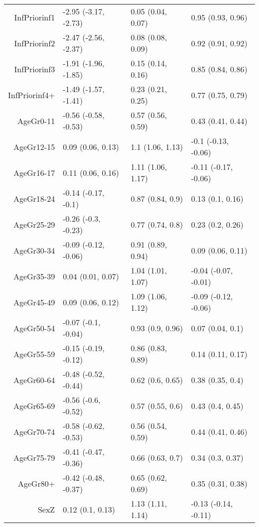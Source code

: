 \begin{table}[ht]
\begin{tabular}{rlll}
  InfPriorinf1 & -2.95 (-3.17, -2.73) & 0.05 (0.04, 0.07) & 0.95 (0.93, 0.96) \\ 
  InfPriorinf2 & -2.47 (-2.56, -2.37) & 0.08 (0.08, 0.09) & 0.92 (0.91, 0.92) \\ 
  InfPriorinf3 & -1.91 (-1.96, -1.85) & 0.15 (0.14, 0.16) & 0.85 (0.84, 0.86) \\ 
  InfPriorinf4+ & -1.49 (-1.57, -1.41) & 0.23 (0.21, 0.25) & 0.77 (0.75, 0.79) \\ 
  AgeGr0-11 & -0.56 (-0.58, -0.53) & 0.57 (0.56, 0.59) & 0.43 (0.41, 0.44) \\ 
  AgeGr12-15 & 0.09 (0.06, 0.13) & 1.1 (1.06, 1.13) & -0.1 (-0.13, -0.06) \\ 
  AgeGr16-17 & 0.11 (0.06, 0.16) & 1.11 (1.06, 1.17) & -0.11 (-0.17, -0.06) \\ 
  AgeGr18-24 & -0.14 (-0.17, -0.1) & 0.87 (0.84, 0.9) & 0.13 (0.1, 0.16) \\ 
  AgeGr25-29 & -0.26 (-0.3, -0.23) & 0.77 (0.74, 0.8) & 0.23 (0.2, 0.26) \\ 
  AgeGr30-34 & -0.09 (-0.12, -0.06) & 0.91 (0.89, 0.94) & 0.09 (0.06, 0.11) \\ 
  AgeGr35-39 & 0.04 (0.01, 0.07) & 1.04 (1.01, 1.07) & -0.04 (-0.07, -0.01) \\ 
  AgeGr45-49 & 0.09 (0.06, 0.12) & 1.09 (1.06, 1.12) & -0.09 (-0.12, -0.06) \\ 
  AgeGr50-54 & -0.07 (-0.1, -0.04) & 0.93 (0.9, 0.96) & 0.07 (0.04, 0.1) \\ 
  AgeGr55-59 & -0.15 (-0.19, -0.12) & 0.86 (0.83, 0.89) & 0.14 (0.11, 0.17) \\ 
  AgeGr60-64 & -0.48 (-0.52, -0.44) & 0.62 (0.6, 0.65) & 0.38 (0.35, 0.4) \\ 
  AgeGr65-69 & -0.56 (-0.6, -0.52) & 0.57 (0.55, 0.6) & 0.43 (0.4, 0.45) \\ 
  AgeGr70-74 & -0.58 (-0.62, -0.53) & 0.56 (0.54, 0.59) & 0.44 (0.41, 0.46) \\ 
  AgeGr75-79 & -0.41 (-0.47, -0.36) & 0.66 (0.63, 0.7) & 0.34 (0.3, 0.37) \\ 
  AgeGr80+ & -0.42 (-0.48, -0.37) & 0.65 (0.62, 0.69) & 0.35 (0.31, 0.38) \\ 
  SexZ & 0.12 (0.1, 0.13) & 1.13 (1.11, 1.14) & -0.13 (-0.14, -0.11) \\ 
   \hline
\end{tabular}
\end{table}
